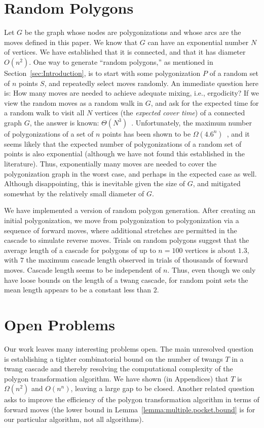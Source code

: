 \pdfoutput=1  \documentclass{article}
\newcommand{\seclab}[1]{\label{sec:#1}}
\newcommand{\lemref}[1]{\ref{lemma:#1}}
\newcommand{\secref}[1]{\ref{sec:#1}}
\begin{document}
\section{Random Polygons}
\seclab{Random.Polygons}
Let $G$ be the graph whose nodes are polygonizations and whose
arcs are the moves defined in this paper.
We know that $G$ can have an exponential number $N$ of vertices.
We have established that it is connected,
and that it has diameter $O(n^2)$.
One way to generate ``random polygons,'' as mentioned in
Section~\secref{Introduction}, is to start with some polygonization
$P$ of a random set of $n$ points $S$,
and repeatedly select moves randomly.
An immediate question here is: How
many moves are needed to achieve adequate mixing, i.e.,
ergodicity? If we view the random moves as a random walk in $G$,
and ask for the 
expected time for a random walk to visit all $N$
vertices (the \emph{expected cover time})
of a connected graph $G$,
the answer is known: $\Theta(N^3)$~\cite{f-tupct-95}.
Unfortunately, 
the maximum number of polygonizations of a set of $n$ points
has been shown to be $\Omega(4.6^n)$~\cite{gnt-lbncf-00},
and it seems likely that the expected number of polygonizations of a
random set of points is also exponential
(although
we have not found this established in the literature).
Thus, exponentially many moves
are needed to cover the polygonization graph in the worst case, and perhaps
in the expected case as well.
Although disappointing, this is inevitable given the size of $G$,
and mitigated somewhat by the relatively small diameter of $G$.




We have implemented a version of random polygon generation. After
creating an initial polygonization, we move from polygonization to
polygonization via a sequence of forward moves, where additional
stretches are permitted in the cascade to simulate reverse moves.
Trials on random polygons suggest that the average length of a
cascade for polygons of up to $n{=}100$ vertices is about $1.3$, with
$7$ the maximum cascade length observed in
trials of thousands of forward moves. 
Cascade length seems to be independent of $n$.
Thus, even though 
we only have loose bounds on the length of a twang cascade,
for random point sets the mean length appears to be a constant less than $2$.


\vspace{-0.8em}
\section{Open Problems}
\vspace{-0.2em} 
\seclab{Open.Problems} Our work leaves many interesting problems
open. 
The main unresolved question is establishing a tighter combinatorial
bound on the number of twangs $T$ in a twang cascade and thereby
resolving the computational complexity of the polygon transformation
algorithm.  We have shown (in Appendices)
that $T$ is $\Omega(n^2)$ and $O(n^n)$,
leaving a large gap to be closed.
Another related question asks to improve the efficiency of
the polygon transformation algorithm in terms of forward moves (the
lower bound in Lemma~\lemref{multiple.pocket.bound} is for our
particular algorithm, not all algorithms).
\end{document}
